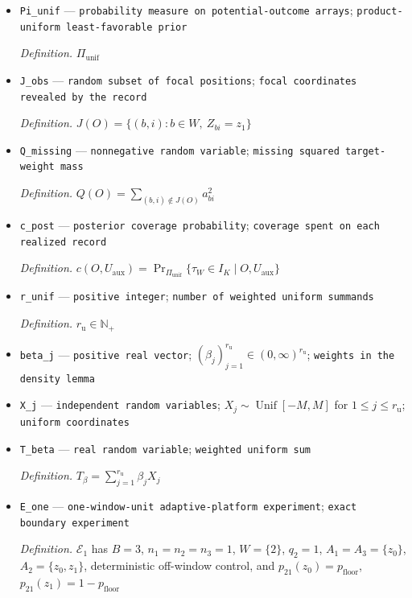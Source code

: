\documentclass{article}
\begin{document}
\begin{itemize}
  \item \texttt{Pi\_\allowbreak{}unif} --- \texttt{probability measure on potential-\allowbreak{}outcome arrays}; \texttt{product-\allowbreak{}uniform least-\allowbreak{}favorable prior}
  \par\smallskip\noindent\emph{Definition.} \(\Pi_{\mathrm{unif}}\)
  \item \texttt{J\_\allowbreak{}obs} --- \texttt{random subset of focal positions}; \texttt{focal coordinates revealed by the record}
  \par\smallskip\noindent\emph{Definition.} \(J(O)=\{(b,i):b\in W,\ Z_{bi}=z_1\}\)
  \item \texttt{Q\_\allowbreak{}missing} --- \texttt{nonnegative random variable}; \texttt{missing squared target-\allowbreak{}weight mass}
  \par\smallskip\noindent\emph{Definition.} \(Q(O)=\sum_{(b,i)\notin J(O)}a_{bi}^2\)
  \item \texttt{c\_\allowbreak{}post} --- \texttt{posterior coverage probability}; \texttt{coverage spent on each realized record}
  \par\smallskip\noindent\emph{Definition.} \(c(O,U_{\mathrm{aux}})=\Pr_{\Pi_{\mathrm{unif}}}\{\tau_W\in I_K\mid O,U_{\mathrm{aux}}\}\)
  \item \texttt{r\_\allowbreak{}unif} --- \texttt{positive integer}; \texttt{number of weighted uniform summands}
  \par\smallskip\noindent\emph{Definition.} \(r_{\mathrm u}\in\mathbb N_{+}\)
  \item \texttt{beta\_\allowbreak{}j} --- \texttt{positive real vector}; \((\beta_j)_{j=1}^{r_{\mathrm u}}\in(0,\infty)^{r_{\mathrm u}}\); \texttt{weights in the density lemma}
  \item \texttt{X\_\allowbreak{}j} --- \texttt{independent random variables}; \(X_j\sim\operatorname{Unif}[-M,M]\) for \(1\le j\le r_{\mathrm u}\); \texttt{uniform coordinates}
  \item \texttt{T\_\allowbreak{}beta} --- \texttt{real random variable}; \texttt{weighted uniform sum}
  \par\smallskip\noindent\emph{Definition.} \(T_\beta=\sum_{j=1}^{r_{\mathrm u}}\beta_jX_j\)
  \item \texttt{E\_\allowbreak{}one} --- \texttt{one-\allowbreak{}window-\allowbreak{}unit adaptive-\allowbreak{}platform experiment}; \texttt{exact boundary experiment}
  \par\smallskip\noindent\emph{Definition.} \(\mathcal E_1\) has \(B=3\), \(n_1=n_2=n_3=1\), \(W=\{2\}\), \(q_2=1\), \(A_1=A_3=\{z_0\}\), \(A_2=\{z_0,z_1\}\), deterministic off-window control, and \(p_{21}(z_0)=p_{\mathrm{floor}}\), \(p_{21}(z_1)=1-p_{\mathrm{floor}}\)

\end{itemize}
\end{document}
